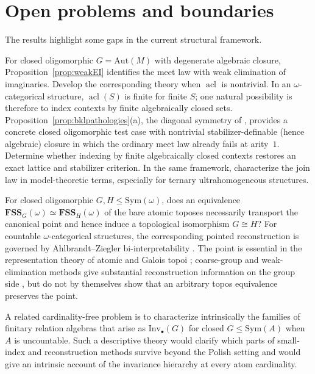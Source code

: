 \documentclass{lmcs}
\newcommand{\Sym}{\mathrm{Sym}}
\newcommand{\Inv}{\mathrm{Inv}}
\newcommand{\Aut}{\mathrm{Aut}}
\newcommand{\FSS}{\mathbf{FSS}}
\begin{document}
\section{Open problems and boundaries}\label{sec:problems}

The results highlight some gaps in the current structural framework.


\begin{qu}
\label{q:charmeet}
For closed oligomorphic $G=\Aut(M)$ with degenerate algebraic closure,
Proposition~\ref{prop:weakEI} identifies the meet law with weak
elimination of imaginaries. Develop the corresponding theory when
$\operatorname{acl}$ is nontrivial. In an $\omega$-categorical
structure, $\operatorname{acl}(S)$ is finite for finite $S$; one
natural possibility is therefore to index contexts by finite
algebraically closed sets. Proposition~\ref{prop:bklpathologies}(a), the diagonal symmetry of \cite[Example~9.1]{BKL14}, provides a concrete closed oligomorphic test case with nontrivial stabilizer-definable (hence algebraic) closure in which the ordinary meet law already fails at arity~$1$. Determine whether indexing by finite algebraically closed contexts restores an exact
lattice and stabilizer criterion. In the same framework, characterize
the join law in model-theoretic terms, especially for ternary
ultrahomogeneous structures.
\end{qu}

\begin{qu}
\label{q:reconstruction}
For closed oligomorphic $G,H\leq\Sym(\omega)$, does an equivalence
$\FSS_G(\omega)\simeq\FSS_H(\omega)$ of the bare atomic toposes
necessarily transport the canonical point and hence induce a
topological isomorphism $G\cong H$?  For countable
$\omega$-categorical structures, the corresponding pointed
reconstruction is governed by Ahlbrandt--Ziegler bi-interpretability
\cite{AZ86}. The point is essential in the
representation theory of atomic and Galois topoi
\cite{Dubuc04}; coarse-group and weak-elimination methods give
substantial reconstruction information on the group side
\cite{Paolini24}, but do not by themselves show
that an arbitrary topos equivalence preserves the point.

A related cardinality-free problem is to characterize intrinsically the
families of finitary relation algebras that arise as
$\Inv_\bullet(G)$ for closed $G\leq\Sym(A)$ when $A$ is
uncountable. Such a descriptive theory would clarify which parts of
small-index and reconstruction methods survive beyond the Polish
setting and would give an intrinsic account of the invariance hierarchy
at every atom cardinality.
\end{qu}
\end{document}
